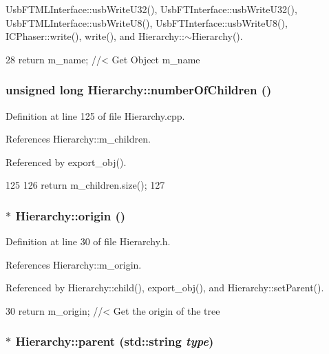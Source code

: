 UsbFTMLInterface::usbWriteU32(), UsbFTInterface::usbWriteU32(), UsbFTMLInterface::usbWriteU8(), UsbFTInterface::usbWriteU8(), ICPhaser::write(), write(), and Hierarchy::$\sim$Hierarchy().


\begin{DoxyCode}
28 { return m_name; } //< Get Object m_name
\end{DoxyCode}
\hypertarget{classHierarchy_ab16e84de65fd84e14001a6cf941c8be4}{
\subsubsection[{numberOfChildren}]{\setlength{\rightskip}{0pt plus 5cm}unsigned long Hierarchy::numberOfChildren ()}}
\label{classHierarchy_ab16e84de65fd84e14001a6cf941c8be4}


Definition at line 125 of file Hierarchy.cpp.

References Hierarchy::m\_\-children.

Referenced by export\_\-obj().


\begin{DoxyCode}
125                                            {
126   return m_children.size();
127 }
\end{DoxyCode}
\hypertarget{classHierarchy_aee461dc930ce3871636ff87f075b1b83}{
\subsubsection[{origin}]{$\ast$ Hierarchy::origin ()}}
\label{classHierarchy_aee461dc930ce3871636ff87f075b1b83}


Definition at line 30 of file Hierarchy.h.

References Hierarchy::m\_\-origin.

Referenced by Hierarchy::child(), export\_\-obj(), and Hierarchy::setParent().


\begin{DoxyCode}
30 { return m_origin; }  //< Get the origin of the tree
\end{DoxyCode}
\hypertarget{classHierarchy_ad550588733bf75ac5c0fcfd7c8fd11a6}{
\subsubsection[{parent}]{ $\ast$ Hierarchy::parent (std::string {\em type})}}
\label{classHierarchy_ad550588733bf75ac5c0fcfd7c8fd11a6}


